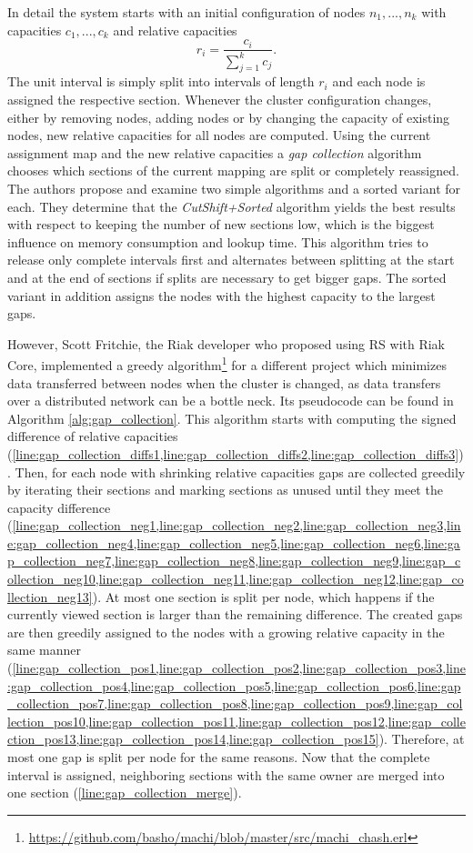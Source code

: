 In detail the system starts with an initial configuration of nodes $n_1,...,n_k$ with capacities $c_1,...,c_k$ and relative capacities
\[
	r_i = \frac{c_i}{\sum\limits_{j=1}^kc_j}.
\]
The unit interval is simply split into intervals of length $r_i$ and each node is assigned the respective section.
Whenever the cluster configuration changes, either by removing nodes, adding nodes or by changing the capacity of existing nodes, new relative capacities for all nodes are computed.
Using the current assignment map and the new relative capacities a \emph{gap collection} algorithm chooses which sections of the current mapping are split or completely reassigned.
The authors propose and examine two simple algorithms and a sorted variant for each.
They determine that the \emph{CutShift+Sorted} algorithm yields the best results with respect to keeping the number of new sections low, which is the biggest influence on memory consumption and lookup time.
This algorithm tries to release only complete intervals first and alternates between splitting at the start and at the end of sections if splits are necessary to get bigger gaps.
The sorted variant in addition assigns the nodes with the highest capacity to the largest gaps.

However, Scott Fritchie, the Riak developer who proposed using \ac{RS} with Riak Core\cite{Fritchie2018}, implemented a greedy algorithm\footnote{\url{https://github.com/basho/machi/blob/master/src/machi_chash.erl}} for a different project which minimizes data transferred between nodes when the cluster is changed, as data transfers over a distributed network can be a bottle neck\cite{Fritchie2018}.
Its pseudocode can be found in Algorithm \ref{alg:gap_collection}.
This algorithm starts with computing the signed difference of relative capacities (\cref{line:gap_collection_diffs1,line:gap_collection_diffs2,line:gap_collection_diffs3}).
Then, for each node with shrinking relative capacities gaps are collected greedily by iterating their sections and marking sections as unused until they meet the capacity difference (\cref{line:gap_collection_neg1,line:gap_collection_neg2,line:gap_collection_neg3,line:gap_collection_neg4,line:gap_collection_neg5,line:gap_collection_neg6,line:gap_collection_neg7,line:gap_collection_neg8,line:gap_collection_neg9,line:gap_collection_neg10,line:gap_collection_neg11,line:gap_collection_neg12,line:gap_collection_neg13}).
At most one section is split per node, which happens if the currently viewed section is larger than the remaining difference.
The created gaps are then greedily assigned to the nodes with a growing relative capacity in the same manner (\cref{line:gap_collection_pos1,line:gap_collection_pos2,line:gap_collection_pos3,line:gap_collection_pos4,line:gap_collection_pos5,line:gap_collection_pos6,line:gap_collection_pos7,line:gap_collection_pos8,line:gap_collection_pos9,line:gap_collection_pos10,line:gap_collection_pos11,line:gap_collection_pos12,line:gap_collection_pos13,line:gap_collection_pos14,line:gap_collection_pos15}).
Therefore, at most one gap is split per node for the same reasons.
Now that the complete interval is assigned, neighboring sections with the same owner are merged into one section (\cref{line:gap_collection_merge}).

